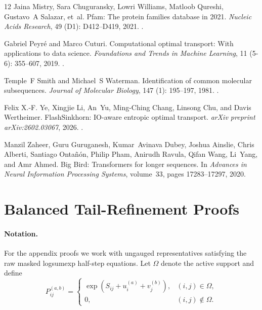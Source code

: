 \documentclass{article}
\begin{document}
\begin{thebibliography}{12}
Jaina Mistry, Sara Chuguransky, Lowri Williams, Matloob Qureshi, Gustavo~A
  Salazar, et~al.
\newblock Pfam: The protein families database in 2021.
\newblock \emph{Nucleic Acids Research}, 49 (D1): D412--D419,
  2021.
\newblock {}.

Gabriel Peyr{\'e} and Marco Cuturi.
\newblock Computational optimal transport: With applications to data science.
\newblock \emph{Foundations and Trends in Machine Learning}, 11
  (5-6): 355--607, 2019.
\newblock {}.

Temple~F Smith and Michael~S Waterman.
\newblock Identification of common molecular subsequences.
\newblock \emph{Journal of Molecular Biology}, 147 (1):
  195--197, 1981.
\newblock {}.

Felix X.-F. Ye, Xingjie Li, An~Yu, Ming-Ching Chang, Linsong Chu, and Davis
  Wertheimer.
\newblock Flash{S}inkhorn: {IO}-aware entropic optimal transport.
\newblock \emph{arXiv preprint arXiv:2602.03067}, 2026.
\newblock {}.

Manzil Zaheer, Guru Guruganesh, Kumar~Avinava Dubey, Joshua Ainslie, Chris
  Alberti, Santiago Onta{\~n}{\'o}n, Philip Pham, Anirudh Ravula, Qifan Wang,
  Li~Yang, and Amr Ahmed.
\newblock Big {B}ird: Transformers for longer sequences.
\newblock In \emph{Advances in Neural Information Processing Systems},
  volume~33, pages 17283--17297, 2020.

\end{thebibliography}

\newpage
\appendix

\section{Balanced Tail-Refinement Proofs}
\label{app:proofs}

\paragraph{Notation.}
For the appendix proofs we work with ungauged representatives satisfying the raw masked logsumexp half-step equations. Let $\Omega$ denote the active support and define
\[
P^{(a,b)}_{ij} =
\begin{cases}
\exp(S_{ij}+u_i^{(a)}+v_j^{(b)}), & (i,j)\in\Omega, \\
0, & (i,j)\notin\Omega.
\end{cases}
\]
\end{document}
